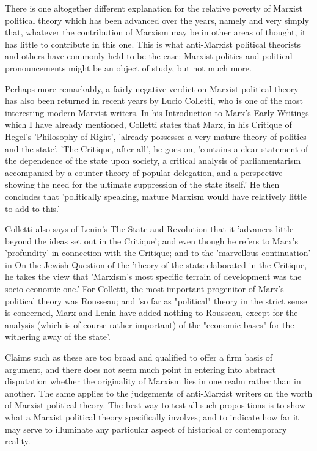 There is one altogether different explanation for the relative poverty of Marxist political theory which has been advanced over the years, namely and very simply that, whatever the contribution of Marxism may be in other areas of thought, it has little to contribute in this one. This is what anti-Marxist political theorists and others have commonly held to be the case: Marxist politics and political pronouncements might be an object of study, but not much more.

Perhaps more remarkably, a fairly negative verdict on Marxist political theory has also been returned in recent years by Lucio Colletti, who is one of the most interesting modern Marxist writers. In his Introduction to Marx's Early Writings which I have already mentioned, Colletti states that Marx, in his Critique of Hegel's 'Philosophy of Right', 'already possesses a very mature theory of politics and the state'. 'The Critique, after all', he goes on, 'contains a clear statement of the dependence of the state upon society, a critical analysis of parliamentarism accompanied by a counter\hyp{}theory of popular delegation, and a perspective showing the need for the ultimate suppression of the state itself.' He then concludes that 'politically speaking, mature Marxism would have relatively little to add to this.'

Colletti also says of Lenin's The State and Revolution that it 'advances little beyond the ideas set out in the Critique'; and even though he refers to Marx's 'profundity' in connection with the Critique; and to the 'marvellous continuation' in On the Jewish Question of the 'theory of the state elaborated in the Critique, he takes the view that 'Marxism's most specific terrain of development was the socio\hyp{}economic one.' For Colletti, the most important progenitor of Marx's political theory was Rousseau; and 'so far as "political" theory in the strict sense is concerned, Marx and Lenin have added nothing to Rousseau, except for the analysis (which is of course rather important) of the "economic bases" for the withering away of the state'.

Claims such as these are too broad and qualified to offer a firm basis of argument, and there does not seem much point in entering into abstract disputation whether the originality of Marxism lies in one realm rather than in another. The same applies to the judgements of anti-Marxist writers on the worth of Marxist political theory. The best way to test all such propositions is to show what a Marxist political theory specifically involves; and to indicate how far it may serve to illuminate any particular aspect of historical or contemporary reality.

